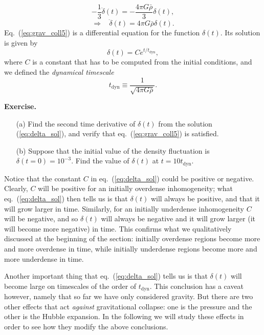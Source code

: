 \documentclass[11pt, a4paper,oneside,openright]{book}
\numberwithin{equation}{section}
\begin{document}
\begin{equation}
-\frac{1}{3}\ddot{\delta}(t)=-\frac{4\pi G\bar{\rho}}{3}\delta(t),
\end{equation}
\begin{equation} \label{eq:grav_coll5}
\Rightarrow~~~~ \ddot{\delta}(t)=4\pi G\bar{\rho}\delta(t).
\end{equation}
Eq.\ (\ref{eq:grav_coll5}) is a differential equation for the function $\delta(t)$. Its solution is given by
\begin{equation} \label{eq:delta_sol}
\delta(t)=Ce^{t/t_{\mathrm{dyn}}},
\end{equation}
where $C$ is a constant that has to be computed from the initial conditions, and we defined the {\it dynamical timescale}
\begin{equation}
t_{\mathrm{dyn}}\equiv \frac{1}{\sqrt{4\pi G \bar{\rho}}}.
\end{equation}

\newpage

{\bf Exercise.}
\begin{itemize}
\item [(a)] Find the second time derivative of $\delta(t)$ from the solution (\ref{eq:delta_sol}), and verify that eq.\ (\ref{eq:grav_coll5}) is satisfied.
\item [(b)] Suppose that the initial value of the density fluctuation is $\delta(t=0)=10^{-3}$. Find the value of $\delta(t)$ at $t=10t_{\mathrm{dyn}}$.
\end{itemize}

\par\vspace{\baselineskip}

Notice that the constant $C$ in eq.\ (\ref{eq:delta_sol}) could be positive or negative. Clearly, $C$ will be positive for an initially overdense inhomogeneity; what eq.\ (\ref{eq:delta_sol}) then tells us is that $\delta(t)$ will always be positive, and that it will grow larger in time. Similarly, for an initially underdense inhomogeneity $C$ will be negative, and so $\delta(t)$ will always be negative and it will grow larger (it will become more negative) in time. This confirms what we qualitatively discussed at the beginning of the section: initially overdense regions become more and more overdense in time, while initially underdense regions become more and more underdense in time.

Another important thing that eq.\ (\ref{eq:delta_sol}) tells us is that $\delta(t)$ will become large on timescales of the order of $t_{\mathrm{dyn}}$. This conclusion has a caveat however, namely that so far we have only considered gravity. But there are two other effects that act {\it against} gravitational collapse: one is the pressure and the other is the Hubble expansion. In the following we will study these effects in order to see how they modify the above conclusions.
\end{document}
